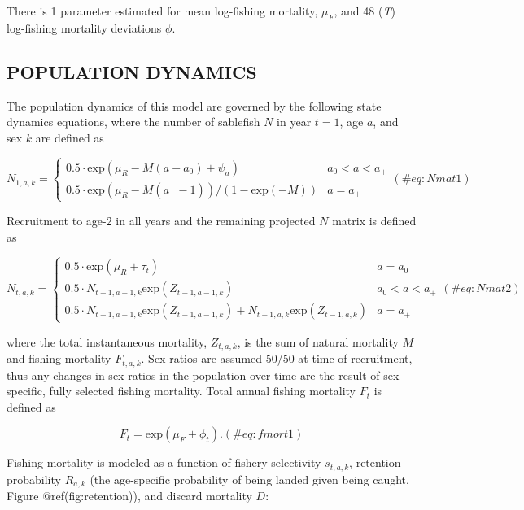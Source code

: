 \documentclass[
]{article}
\begin{document}
There is 1 parameter estimated for mean log-fishing mortality,
\emph{\(\mu_F\)}, and 48 (\emph{T}) log-fishing mortality deviations
\emph{\(\phi\)}.

\hypertarget{population-dynamics}{%
\subsection{POPULATION DYNAMICS}\label{population-dynamics}}

The population dynamics of this model are governed by the following
state dynamics equations, where the number of sablefish \(N\) in year
\(t=1\), age \(a\), and sex \(k\) are defined as

\[
\begin{equation}
N_{1,a,k} = \left\{ \begin{array}{ll}
0.5\cdot\mbox{exp}(\mu_R-M(a-a_0)+\psi_a) &a_{0}<a<a_{+}\\
0.5\cdot\mbox{exp}(\mu_R-M(a_{+}-1))/(1-\mbox{exp}(-M)) &a=a_{+}
\end{array}\right.
(\#eq:Nmat1)
\end{equation}
\]

Recruitment to age-2 in all years and the remaining projected \(N\)
matrix is defined as

\[
\begin{equation}
N_{t,a,k} = \left\{ \begin{array}{ll}
0.5\cdot\mbox{exp}(\mu_R+\tau_t) &a=a_0\\
0.5\cdot N_{t-1,a-1,k}\mbox{exp}(Z_{t-1,a-1,k}) &a_{0}<a<a_{+}\\
0.5\cdot N_{t-1,a-1,k}\mbox{exp}(Z_{t-1,a-1,k})+N_{t-1,a,k}\mbox{exp}(Z_{t-1,a,k}) &a=a_{+}
\end{array}\right.
(\#eq:Nmat2)
\end{equation}
\]

where the total instantaneous mortality, \(Z_{t,a,k}\), is the sum of
natural mortality \(M\) and fishing mortality \(F_{t,a,k}\). Sex ratios
are assumed 50/50 at time of recruitment, thus any changes in sex ratios
in the population over time are the result of sex-specific, fully
selected fishing mortality. Total annual fishing mortality
\emph{\(F_t\)} is defined as

\[
\begin{equation}
F_t=\mbox{exp}(\mu_F+\phi_t).
(\#eq:fmort1)
\end{equation}
\]

Fishing mortality is modeled as a function of fishery selectivity
\(s_{t,a,k}\), retention probability \(R_{a,k}\) (the age-specific
probability of being landed given being caught, Figure
@ref(fig:retention)), and discard mortality \(D\):
\end{document}

